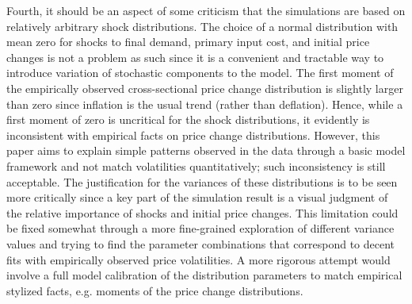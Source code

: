 Fourth, it should be an aspect of some criticism that the simulations are based on relatively arbitrary shock distributions. The choice 
of a normal distribution with mean zero for shocks to final demand, primary input cost, and initial price changes is not a problem as 
such since it is a convenient and tractable way to introduce variation of stochastic components to the model. The first moment of the 
empirically observed cross-sectional price change distribution is slightly larger than zero since inflation is the usual trend (rather 
than deflation). Hence, while a first moment of zero is uncritical for the shock distributions, it evidently is inconsistent with 
empirical facts on price change distributions. However, this paper aims to explain simple patterns observed in the data through a basic 
model framework and not match volatilities quantitatively; such inconsistency is still acceptable. The justification for the variances 
of these distributions is to be seen more critically since a key part of the simulation result is a visual judgment of the relative 
importance of shocks and initial price changes. This limitation could be fixed somewhat through a more fine-grained exploration of 
different variance values and trying to find the parameter combinations that correspond to decent fits with empirically observed price 
volatilities. A more rigorous attempt would involve a full model calibration of the distribution parameters to match empirical stylized 
facts, e.g. moments of the price change distributions.





